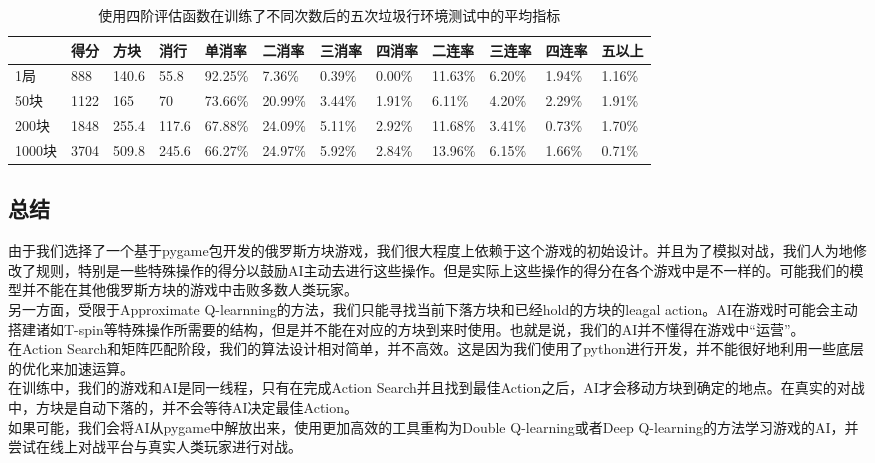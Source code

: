 \documentclass[10pt,UTF8]{article}
\begin{document}
\begin{table}[h]
    \centering
    \caption{使用四阶评估函数在训练了不同次数后的五次垃圾行环境测试中的平均指标}
    \begin{tabular}{@{}llllllllllll@{}}
    \toprule
          & 得分   & 方块    & 消行    & 单消率     & 二消率     & 三消率    & 四消率    & 二连率     & 三连率    & 四连率    & 五以上    \\ \midrule
    1局    & 888  & 140.6 & 55.8  & 92.25\% & 7.36\%  & 0.39\% & 0.00\% & 11.63\% & 6.20\% & 1.94\% & 1.16\% \\
    50块   & 1122 & 165   & 70    & 73.66\% & 20.99\% & 3.44\% & 1.91\% & 6.11\%  & 4.20\% & 2.29\% & 1.91\% \\
    200块  & 1848 & 255.4 & 117.6 & 67.88\% & 24.09\% & 5.11\% & 2.92\% & 11.68\% & 3.41\% & 0.73\% & 1.70\% \\
    1000块 & 3704 & 509.8 & 245.6 & 66.27\% & 24.97\% & 5.92\% & 2.84\% & 13.96\% & 6.15\% & 1.66\% & 0.71\% \\ \bottomrule
    \end{tabular}
    \end{table}

\begin{multicols}{2}

\section{总结}

由于我们选择了一个基于pygame包开发的俄罗斯方块游戏，我们很大程度上依赖于这个游戏的初始设计。并且为了模拟对战，我们人为地修改了规则，特别是一些特殊操作的得分以鼓励AI主动去进行这些操作。但是实际上这些操作的得分在各个游戏中是不一样的。可能我们的模型并不能在其他俄罗斯方块的游戏中击败多数人类玩家。\\

另一方面，受限于Approximate Q-learnning的方法，我们只能寻找当前下落方块和已经hold的方块的leagal action。AI在游戏时可能会主动搭建诸如T-spin等特殊操作所需要的结构，但是并不能在对应的方块到来时使用。也就是说，我们的AI并不懂得在游戏中“运营”。 \\

在Action Search和矩阵匹配阶段，我们的算法设计相对简单，并不高效。这是因为我们使用了python进行开发，并不能很好地利用一些底层的优化来加速运算。\\

在训练中，我们的游戏和AI是同一线程，只有在完成Action Search并且找到最佳Action之后，AI才会移动方块到确定的地点。在真实的对战中，方块是自动下落的，并不会等待AI决定最佳Action。\\

如果可能，我们会将AI从pygame中解放出来，使用更加高效的工具重构为Double Q-learning或者Deep Q-learning的方法学习游戏的AI，并尝试在线上对战平台与真实人类玩家进行对战。\cite{ref1}

\end{multicols}
\end{document}

